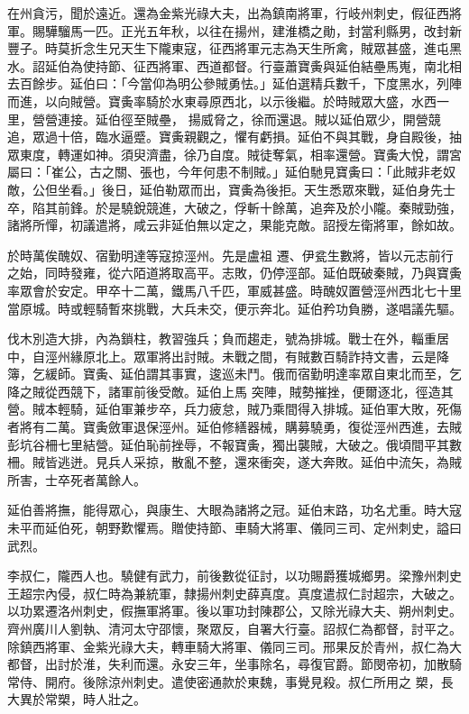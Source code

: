 \begin{pinyinscope}
 在州貪污，聞於遠近。還為金紫光祿大夫，出為鎮南將軍，行岐州刺史，假征西將軍。賜驊騮馬一匹。正光五年秋，以往在揚州，建淮橋之勛，封當利縣男，改封新豐子。時莫折念生兄天生下隴東寇，征西將軍元志為天生所禽，賊眾甚盛，進屯黑水。詔延伯為使持節、征西將軍、西道都督。行臺蕭寶夤與延伯結壘馬嵬，南北相去百餘步。延伯曰：「今當仰為明公參賊勇怯。」延伯選精兵數千，下度黑水，列陣而進，以向賊營。寶夤率騎於水東尋原西北，以示後繼。於時賊眾大盛，水西一里，營營連接。延伯徑至賊壘，
 揚威脅之，徐而還退。賊以延伯眾少，開營競追，眾過十倍，臨水逼蹙。寶夤親觀之，懼有虧損。延伯不與其戰，身自殿後，抽眾東度，轉運如神。須臾濟盡，徐乃自度。賊徒奪氣，相率還營。寶夤大悅，謂宮屬曰：「崔公，古之關、張也，今年何患不制賊。」延伯馳見寶夤曰：「此賊非老奴敵，公但坐看。」後日，延伯勒眾而出，寶夤為後拒。天生悉眾來戰，延伯身先士卒，陷其前鋒。於是驍銳競進，大破之，俘斬十餘萬，追奔及於小隴。秦賊勁強，諸將所憚，初議遣將，咸云非延伯無以定之，果能克敵。詔授左衛將軍，餘如故。



 於時萬俟醜奴、宿勤明達等寇掠涇州。先是盧祖
 遷、伊瓫生數將，皆以元志前行之始，同時發雍，從六陌道將取高平。志敗，仍停涇部。延伯既破秦賊，乃與寶夤率眾會於安定。甲卒十二萬，鐵馬八千匹，軍威甚盛。時醜奴置營涇州西北七十里當原城。時或輕騎暫來挑戰，大兵未交，便示奔北。延伯矜功負勝，遂唱議先驅。



 伐木別造大排，內為鎖柱，教習強兵；負而趨走，號為排城。戰士在外，輜重居中，自涇州緣原北上。眾軍將出討賊。未戰之間，有賊數百騎詐持文書，云是降簿，乞緩師。寶夤、延伯謂其事實，逡巡未鬥。俄而宿勤明達率眾自東北而至，乞降之賊從西競下，諸軍前後受敵。延伯上馬
 突陣，賊勢摧挫，便爾逐北，徑造其營。賊本輕騎，延伯軍兼步卒，兵力疲怠，賊乃乘間得入排城。延伯軍大敗，死傷者將有二萬。寶夤斂軍退保涇州。延伯修繕器械，購募驍勇，復從涇州西進，去賊彭坑谷柵七里結營。延伯恥前挫辱，不報寶夤，獨出襲賊，大破之。俄頃間平其數柵。賊皆逃迸。見兵人采掠，散亂不整，還來衝突，遂大奔敗。延伯中流矢，為賊所害，士卒死者萬餘人。



 延伯善將撫，能得眾心，與康生、大眼為諸將之冠。延伯末路，功名尤重。時大寇未平而延伯死，朝野歎懼焉。贈使持節、車騎大將軍、儀同三司、定州刺史，謚曰武烈。



 李叔仁，隴西人也。驍健有武力，前後數從征討，以功賜爵獲城鄉男。梁豫州刺史王超宗內侵，叔仁時為兼統軍，隸揚州刺史薛真度。真度遣叔仁討超宗，大破之。以功累遷洛州刺史，假撫軍將軍。後以軍功封陳郡公，又除光祿大夫、朔州刺史。齊州廣川人劉執、清河太守邵懷，聚眾反，自署大行臺。詔叔仁為都督，討平之。除鎮西將軍、金紫光祿大夫，轉車騎大將軍、儀同三司。邢果反於青州，叔仁為大都督，出討於淮，失利而還。永安三年，坐事除名，尋復官爵。節閔帝初，加散騎常侍、開府。後除涼州刺史。遣使密通款於東魏，事覺見殺。叔仁所用之
 槊，長大異於常槊，時人壯之。




\end{pinyinscope}
